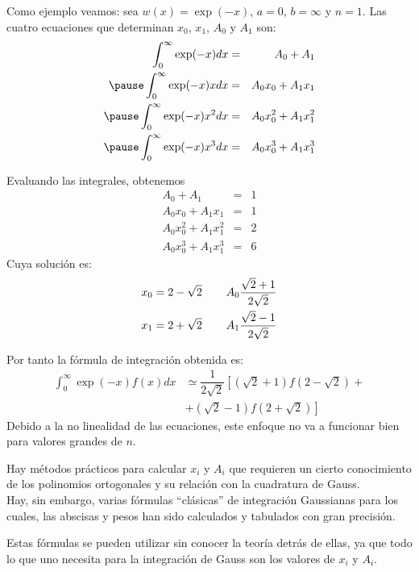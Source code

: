 \begin{frame}
Como ejemplo veamos: sea $w(x)= \exp(-x)$, $a=0$, $b=\infty$ y $n=1$. Las cuatro ecuaciones que determinan $x_{0}$, $x_{1}$, $A_{0}$ y $A_{1}$ son:
\begin{eqnarray*}
\int_{0}^{\infty} \exp(-x) dx &=& A_{0}+A_{1} \\
\pause
\int_{0}^{\infty} \exp(-x) x dx &=& A_{0} x_{0} + A_{1} x_{1} \\
\pause
\int_{0}^{\infty} \exp(-x) x^{2} dx &=& A_{0} x_{0}^{2}+ A_{1} x_{1}^{2} \\
\pause
\int_{0}^{\infty} \exp(-x) x^{3} dx &=& A_{0} x_{0}^{3} + A_{1} x_{1}^{3} \\
\end{eqnarray*}
\end{frame}
\begin{frame}
Evaluando las integrales, obtenemos
\begin{eqnarray*}
A_{0} + A_{1} &=& 1 \\
A_{0} x_{0} + A_{1} x_{1} &=& 1 \\
A_{0} x_{0}^{2} + A_{1} x_{1}^{2} &=& 2 \\
A_{0} x_{0}^{3} + A_{1} x_{1}^{3} &=& 6
\end{eqnarray*}
Cuya solución es:
\begin{eqnarray*}
x_{0} = 2 - \sqrt{2} \hspace{0.75cm} A_{0} \dfrac{\sqrt{2}+1}{2\sqrt{2}} \\
x_{1} = 2 + \sqrt{2} \hspace{0.75cm} A_{1} \dfrac{\sqrt{2}-1}{2\sqrt{2}}
\end{eqnarray*}
\end{frame}
\begin{frame}
Por tanto la fórmula de integración obtenida es:
\begin{eqnarray*}
\int_{0}^{\infty} \exp(-x) f(x) dx & \simeq \dfrac{1}{2\sqrt{2}} \left[ \left( \sqrt{2}+1 \right) f \left(2 - \sqrt{2}\right) + \right. \\ 
&+ \left. \left( \sqrt{2}-1 \right) f\left(2 +\sqrt{2} \right) \right]
\end{eqnarray*}
\pause
Debido a la no linealidad de las ecuaciones, este enfoque no va a funcionar bien para valores grandes de $n$.
\end{frame}
\begin{frame}
Hay métodos prácticos para calcular $x_{i}$ y $A_{i}$ que requieren un cierto conocimiento de los polinomios ortogonales y su relación con la cuadratura de Gauss.
\\
\bigskip
Hay, sin embargo, varias fórmulas \enquote{clásicas} de integración Gaussianas para los cuales, las abscisas y pesos han sido calculados y tabulados con gran precisión.
\end{frame}
\begin{frame}
Estas fórmulas se pueden utilizar sin conocer la teoría detrás de ellas, ya que todo lo que uno necesita para la integración de Gauss son los valores de $x_{i}$ y $A_{i}$.
\end{frame}
